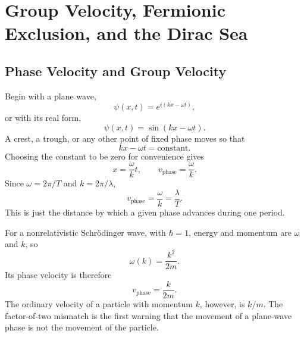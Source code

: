 \chapter{Group Velocity, Fermionic Exclusion, and the Dirac Sea}

\section{Phase Velocity and Group Velocity}

\begin{classroomqa}
\end{classroomqa}

Begin with a plane wave,
\begin{equation}
\psi(x,t)=e^{i(kx-\omega t)},
\end{equation}
or with its real form,
\begin{equation}
\psi(x,t)=\sin(kx-\omega t).
\end{equation}
A crest, a trough, or any other point of fixed phase moves so that
\begin{equation}
kx-\omega t=\text{constant}.
\end{equation}
Choosing the constant to be zero for convenience gives
\begin{equation}
x=\frac{\omega}{k}t,
\qquad
v_{\mathrm{phase}}=\frac{\omega}{k}.
\end{equation}
Since \(\omega=2\pi/T\) and \(k=2\pi/\lambda\),
\begin{equation}
v_{\mathrm{phase}}=\frac{\omega}{k}=\frac{\lambda}{T}.
\end{equation}
This is just the distance by which a given phase advances during one period.

For a nonrelativistic Schr\"odinger wave, with \(\hbar=1\), energy and momentum are \(\omega\) and \(k\), so
\begin{equation}
\omega(k)=\frac{k^2}{2m}.
\end{equation}
Its phase velocity is therefore
\begin{equation}
v_{\mathrm{phase}}=\frac{k}{2m}.
\end{equation}
The ordinary velocity of a particle with momentum \(k\), however, is \(k/m\). The factor-of-two mismatch is the first warning that the movement of a plane-wave phase is not the movement of the particle.

